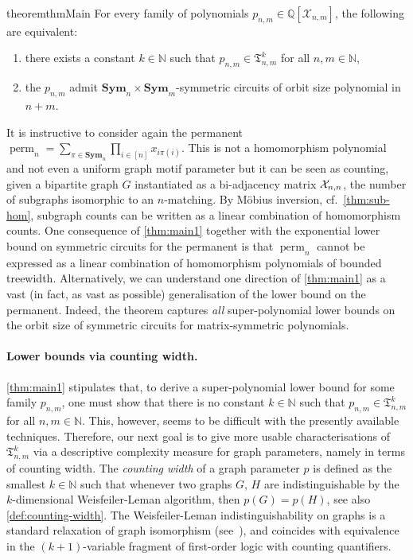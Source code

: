 \documentclass[10pt,a4paper]{article}
\theoremstyle{definition}
\theoremstyle{plain}
\theoremstyle{remark}
\newcommand{\Xx}{{\cal X}}
\DeclareMathOperator{\perm}{perm}
\newcommand{\Sym}{\mathbf{Sym}}
\newcommand{\bbN}{\mathbb{N}}
\begin{document}
\begin{restatable}{theorem}{thmMain}\label{thm:main1}
	For every family of polynomials $p_{n,m} \in \mathbb{Q}[\mathcal{X}_{n,m}]$, the following are equivalent:
	\begin{enumerate}
		\item there exists a constant $k \in \mathbb{N}$ such that $p_{n,m} \in \mathfrak{T}_{n,m}^k$ for all $n,m \in \mathbb{N}$,\label{it:main1}
		\item the $p_{n,m}$ admit $\Sym_n \times \Sym_m$-symmetric circuits of orbit size polynomial in $n+m$.\label{it:main2}
	\end{enumerate}
\end{restatable}


It is instructive to consider again the permanent $\perm_n = \sum_{\pi \in \Sym_n} \prod_{i \in [n]} x_{i\pi(i)}$. 
This is not a homomorphism polynomial
and not even a uniform graph motif parameter
 but it can be seen as counting, given a bipartite graph $G$ instantiated as a bi-adjacency matrix $\Xx_{n,n}$, the number of subgraphs isomorphic to an $n$-matching. 
By M\"obius inversion, cf.\ \cref{thm:sub-hom}, subgraph counts can be written as a linear combination of homomorphism counts.
One consequence of \cref{thm:main1} together with the exponential lower bound on symmetric circuits for the permanent \cite{dawar_symmetric_2025} is that $\perm_n$ cannot be expressed as a linear combination of homomorphism polynomials of bounded treewidth.  
Alternatively, we can understand one direction of \cref{thm:main1} as a vast (in fact, as vast as possible) generalisation of the lower bound on the permanent. 
Indeed, the theorem captures \emph{all} super-polynomial lower bounds on the orbit size of symmetric circuits for matrix-symmetric polynomials.


\paragraph{Lower bounds via counting width.}
\cref{thm:main1} stipulates that, to derive a super-polynomial lower bound for some family $p_{n,m}$, one must show that there is no constant $k \in \bbN$ such that $p_{n,m} \in \mathfrak{T}^k_{n,m}$ for all $n,m \in \bbN$. 
This, however, seems to be difficult with the presently available techniques. 
Therefore, our next goal is to give more usable characterisations of $\mathfrak{T}^k_{n,m}$
via a descriptive complexity measure for graph parameters, namely in terms of counting width. 
The \emph{counting width} \cite{dawar_definability_2017,dawar_notions_2025} of a graph parameter $p$ is defined as the smallest $k \in \bbN$ such that whenever two graphs $G$, $H$ are indistinguishable by the $k$-dimensional Weisfeiler-Leman algorithm, then $p(G) = p(H)$, see also \cref{def:counting-width}.  
The Weisfeiler-Leman indistinguishability on graphs is a standard relaxation of graph
isomorphism (see~\cite{CFI,kiefer2020WL}), and coincides with equivalence in the $(k+1)$-variable fragment of first-order logic with counting quantifiers.
\end{document}
